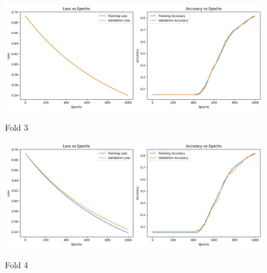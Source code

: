 \documentclass{article}
\begin{document}
\begin{figure}[H] %
    \centering
    \begin{minipage}{0.49\linewidth}
        \centering
        \includegraphics[width=\linewidth]{assets/e-f3.png}
        \caption{Fold 3}{}
        \label{fig:b-1}
    \end{minipage}
    \hfill
    \begin{minipage}{0.49\linewidth}
        \centering
        \includegraphics[width=\linewidth]{assets/e-f4.png}
        \caption{Fold 4}{}
        \label{fig:b-2}
    \end{minipage}
\end{figure}
\end{document}
